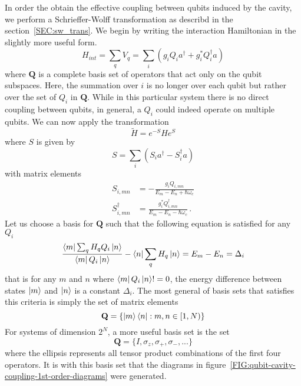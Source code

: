 In order the obtain the effective coupling between qubits induced by the cavity, we perform a Schrieffer-Wolff transformation as describd in the section~\ref{SEC:sw_trans}.
We begin by writing the interaction Hamiltonian in the slightly more useful form.
\begin{equation}
    H_{int} = \sum_q V_q  =\sum_i (g_iQ_ia^\dagger + g_i^*Q_i^\dagger a)
\end{equation}
where $\mathbf{Q}$ is a complete basis set of operators that act only on the qubit subspaces.
Here, the summation over $i$ is no longer over each qubit but rather over the set of $Q_i$ in $\mathbf{Q}$.
While in this particular system there is no direct coupling between qubits, in general, a $Q_i$ could indeed operate on multiple qubits.
We can now apply the transformation
\begin{equation}
    \tilde{H} = e^{-S}He^S
\end{equation}
where $S$ is given by
\begin{equation}
    S = \sum_i (S_ia^\dagger - S_i^\dagger a)
\end{equation}
with matrix elements
\begin{align}
    S_{i,mn}         & = -\frac{g_i Q_{i,mn}}{E_m-E_n+\hbar\omega_c}             \\
    S^\dagger_{i,mn} & = \frac{g_i^*Q^\dagger_{i,mn}}{E_m-E_n-\hbar\omega_c} \,.
\end{align}
Let us choose a basis for $\mathbf{Q}$ such that the following equation is satisfied for any $Q_i$
\begin{equation}
    \frac{\bra{m} \sum_q H_q Q_i \ket{n}}{\bra{m}Q_i\ket{n}}- \bra{n}\sum_qH_q\ket{n} = E_m-E_n = \Delta_i
\end{equation}
that is for any $m$ and $n$ where $\bra{m}Q_i \ket{n} != 0$, the energy difference between states $\ket{m}$ and $\ket{n}$ is a constant $\Delta_i$.
The most general of basis sets that satisfies this criteria is simply the set of matrix elements
\begin{equation}
    \mathbf{Q} = \{ \ket{m}\bra{n}:m,n \in  [1,N) \}
\end{equation}
For systems of dimension $2^N$, a more useful basis set is the set
\begin{equation}
    \mathbf{Q}  =\{ I, \sigma_z, \sigma_+, \sigma_-, ... \}
\end{equation}
where the ellipsis represents all tensor product combinations of the first four operators.
It is with this basis set that the diagrams in figure~\ref{FIG:qubit-cavity-coupling-1st-order-diagrams} were generated.
